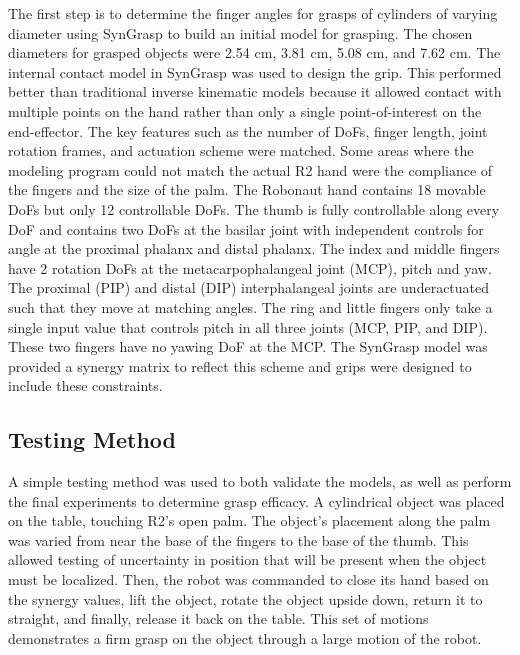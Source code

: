 \documentclass[runningheads,a4paper]{llncs}
\begin{document}
The first step is to determine the finger angles for grasps of cylinders of varying diameter using SynGrasp to build an initial model for grasping.  The chosen diameters for grasped objects were 2.54 cm, 3.81 cm, 5.08 cm, and 7.62 cm.  The internal contact model in SynGrasp was used to design the grip.  This performed better than traditional inverse kinematic models because it allowed contact with multiple points on the hand rather than only a single point-of-interest on the end-effector.  The key features such as the number of DoFs, finger length, joint rotation frames, and actuation scheme were matched.  Some areas where the modeling program could not match the actual R2 hand were the compliance of the fingers and the size of the palm.  The Robonaut hand contains 18 movable DoFs but only 12 controllable DoFs.  The thumb is fully controllable along every DoF and contains two DoFs at the basilar joint with independent controls for angle at the proximal phalanx and distal phalanx.  The index and middle fingers have 2 rotation DoFs at the metacarpophalangeal joint (MCP), pitch and yaw.  The proximal (PIP) and distal (DIP) interphalangeal joints are underactuated such that they move at matching angles.  The ring and little fingers only take a single input value that controls pitch in all three joints (MCP, PIP, and DIP).  These two fingers have no yawing DoF at the MCP.  The SynGrasp model was provided a synergy matrix to reflect this scheme and grips were designed to include these constraints. 


\subsection{Testing Method} 
A simple testing method was used to both validate the models, as well as perform the final experiments to determine grasp efficacy. A cylindrical object was placed on the table, touching R2's open palm. The object's placement along the palm was varied from near the base of the fingers to the base of the thumb. This allowed testing of uncertainty in position that will be present when the object must be localized. Then, the robot was commanded to close its hand based on the synergy values, lift the object, rotate the object upside down, return it to straight, and finally, release it back on the table. This set of motions demonstrates a firm grasp on the object through a large motion of the robot. 
\end{document}
